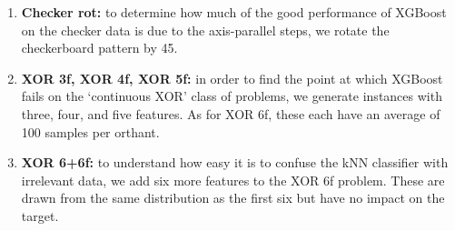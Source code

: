 \begin{enumerate}
\item\textbf{Checker rot:} to determine how much of the good performance of XGBoost on the checker data is due to the axis-parallel steps, we rotate the checkerboard pattern by 45\textdegree.
%
\item\textbf{XOR 3f, XOR 4f, XOR 5f:} in order to find the point at which XGBoost fails on the `continuous XOR' class of problems, we generate instances with three, four, and five features.
As for XOR 6f, these each have an average of 100 samples per orthant.
%
\item\textbf{XOR 6+6f:} to understand how easy it is to confuse the kNN classifier with irrelevant data, we add six more features to the XOR 6f problem.
These are drawn from the same distribution as the first six but have no impact on the target.
\end{enumerate}
%

